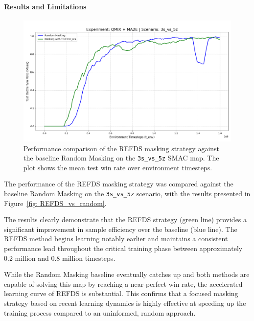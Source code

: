 \paragraph{Results and Limitations}
\begin{figure}[h]
    \centering
   
        
    \includegraphics[width= 0.9\linewidth]{images_pfe/results_li-ma2e/test_battle_won_mean_3s_vs_5z_res_smoothed_full.png}
 
  
    \caption{Performance comparison of the REFDS masking strategy against the baseline Random Masking on the \texttt{3s\_vs\_5z} SMAC map. The plot shows the mean test win rate over environment timesteps.
    }
    \label{fig:REFDS_vs_random}
\end{figure}

The performance of the REFDS masking strategy was compared against the baseline Random Masking on the \texttt{3s\_vs\_5z} scenario, with the results presented in Figure~\ref{fig: REFDS_vs_random}.

The results clearly demonstrate that the REFDS strategy (green line) provides a significant improvement in sample efficiency over the baseline (blue line). The REFDS method begins learning notably earlier and maintains a consistent performance lead throughout the critical training phase between approximately 0.2 million and 0.8 million timesteps.

While the Random Masking baseline eventually catches up and both methods are capable of solving this map by reaching a near-perfect win rate, the accelerated learning curve of REFDS is substantial. This confirms that a focused masking strategy based on recent learning dynamics is highly effective at speeding up the training process compared to an uninformed, random approach.

